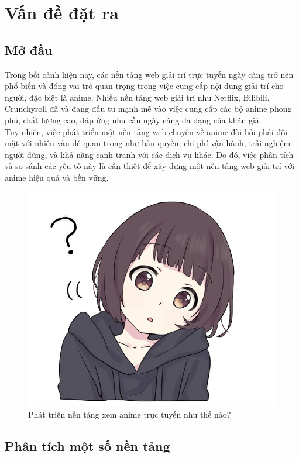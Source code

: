 \section{Vấn đề đặt ra}

\subsection{Mở đầu}
\headindent Trong bối cảnh hiện nay, các nền tảng web giải trí trực tuyến ngày càng trở nên phổ biến và đóng vai trò quan trọng trong việc cung cấp nội dung giải trí cho người, đặc biệt là anime. Nhiều nền tảng web giải trí như Netflix, Bilibili, Crunchyroll đã và đang đầu tư mạnh mẽ vào việc cung cấp các bộ anime phong phú, chất lượng cao, đáp ứng nhu cầu ngày càng đa dạng của khán giả.
\\
\headindent Tuy nhiên, việc phát triển một nền tảng web chuyên về anime đòi hỏi phải đối mặt với nhiều vấn đề quan trọng như bản quyền, chi phí vận hành, trải nghiệm người dùng, và khả năng cạnh tranh với các dịch vụ khác. Do đó, việc phân tích và so sánh các yếu tố này là cần thiết để xây dựng một nền tảng web giải trí với anime hiệu quả và bền vững.

\begin{figure}[H]
\centerline{\includegraphics[width=\linewidth, height=0.8\linewidth]{content/problem/image/girl.jpg}}
\caption{Phát triển nền tảng xem anime trực tuyến như thế nào?}
\label{fig}
\end{figure}

\subsection{Phân tích một số nền tảng}

